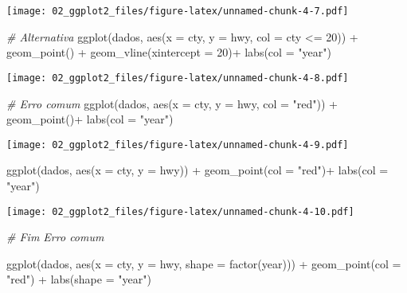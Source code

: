 \documentclass[
]{book}
\newenvironment{Shaded}{\begin{snugshade}}{\end{snugshade}}
\newcommand{\AttributeTok}[1]{\textcolor[rgb]{0.77,0.63,0.00}{#1}}
\newcommand{\CommentTok}[1]{\textcolor[rgb]{0.56,0.35,0.01}{\textit{#1}}}
\newcommand{\DecValTok}[1]{\textcolor[rgb]{0.00,0.00,0.81}{#1}}
\newcommand{\FunctionTok}[1]{\textcolor[rgb]{0.00,0.00,0.00}{#1}}
\newcommand{\NormalTok}[1]{#1}
\newcommand{\SpecialCharTok}[1]{\textcolor[rgb]{0.00,0.00,0.00}{#1}}
\newcommand{\StringTok}[1]{\textcolor[rgb]{0.31,0.60,0.02}{#1}}
\begin{document}
\texttt{[image: 02\_ggplot2\_files/figure-latex/unnamed-chunk-4-7.pdf]}

\begin{Shaded}
\begin{Highlighting}[]
\CommentTok{\# Alternativa}
\FunctionTok{ggplot}\NormalTok{(dados, }\FunctionTok{aes}\NormalTok{(}\AttributeTok{x =}\NormalTok{ cty, }\AttributeTok{y =}\NormalTok{ hwy, }\AttributeTok{col =}\NormalTok{ cty }\SpecialCharTok{\textless{}=} \DecValTok{20}\NormalTok{)) }\SpecialCharTok{+} 
  \FunctionTok{geom\_point}\NormalTok{() }\SpecialCharTok{+} 
  \FunctionTok{geom\_vline}\NormalTok{(}\AttributeTok{xintercept =} \DecValTok{20}\NormalTok{)}\SpecialCharTok{+}
  \FunctionTok{labs}\NormalTok{(}\AttributeTok{col =} \StringTok{"year"}\NormalTok{)}
\end{Highlighting}
\end{Shaded}

\texttt{[image: 02\_ggplot2\_files/figure-latex/unnamed-chunk-4-8.pdf]}

\begin{Shaded}
\begin{Highlighting}[]
\CommentTok{\# Erro comum}
\FunctionTok{ggplot}\NormalTok{(dados, }\FunctionTok{aes}\NormalTok{(}\AttributeTok{x =}\NormalTok{ cty, }\AttributeTok{y =}\NormalTok{ hwy, }\AttributeTok{col =} \StringTok{"red"}\NormalTok{)) }\SpecialCharTok{+} 
  \FunctionTok{geom\_point}\NormalTok{()}\SpecialCharTok{+}
  \FunctionTok{labs}\NormalTok{(}\AttributeTok{col =} \StringTok{"year"}\NormalTok{)}
\end{Highlighting}
\end{Shaded}

\texttt{[image: 02\_ggplot2\_files/figure-latex/unnamed-chunk-4-9.pdf]}

\begin{Shaded}
\begin{Highlighting}[]
\FunctionTok{ggplot}\NormalTok{(dados, }\FunctionTok{aes}\NormalTok{(}\AttributeTok{x =}\NormalTok{ cty, }\AttributeTok{y =}\NormalTok{ hwy)) }\SpecialCharTok{+} 
  \FunctionTok{geom\_point}\NormalTok{(}\AttributeTok{col =} \StringTok{"red"}\NormalTok{)}\SpecialCharTok{+}
  \FunctionTok{labs}\NormalTok{(}\AttributeTok{col =} \StringTok{"year"}\NormalTok{)}
\end{Highlighting}
\end{Shaded}

\texttt{[image: 02\_ggplot2\_files/figure-latex/unnamed-chunk-4-10.pdf]}

\begin{Shaded}
\begin{Highlighting}[]
\CommentTok{\# Fim  Erro comum}

\FunctionTok{ggplot}\NormalTok{(dados, }\FunctionTok{aes}\NormalTok{(}\AttributeTok{x =}\NormalTok{ cty, }\AttributeTok{y =}\NormalTok{ hwy, }\AttributeTok{shape =} \FunctionTok{factor}\NormalTok{(year))) }\SpecialCharTok{+} 
  \FunctionTok{geom\_point}\NormalTok{(}\AttributeTok{col =} \StringTok{"red"}\NormalTok{) }\SpecialCharTok{+} 
  \FunctionTok{labs}\NormalTok{(}\AttributeTok{shape =} \StringTok{"year"}\NormalTok{)}
\end{Highlighting}
\end{Shaded}
\end{document}
